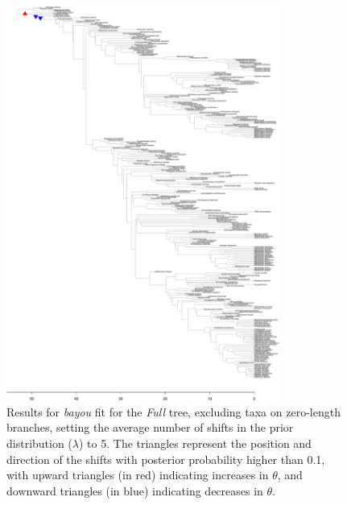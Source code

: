 \begin{figure}[H]
\includegraphics[width=0.8\textwidth]{img/plots-full-k5-1.pdf}
\caption{Results for \textit{bayou} fit for the \textit{Full} tree, excluding taxa on zero-length branches, setting the average number of shifts in the prior distribution ($\lambda$) to 5. The triangles represent the position and direction of the shifts with posterior probability higher than 0.1, with upward triangles (in red) indicating increases in $\theta$, and downward triangles (in blue) indicating decreases in $\theta$.}
\label{fig:full-k5-nzlb}
\end{figure}

\newpage

